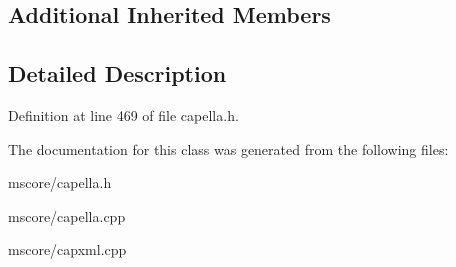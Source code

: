\subsection*{Additional Inherited Members}


\subsection{Detailed Description}


Definition at line 469 of file capella.\+h.



The documentation for this class was generated from the following files\+:\begin{DoxyCompactItemize}
\item 
mscore/capella.\+h\item 
mscore/capella.\+cpp\item 
mscore/capxml.\+cpp\end{DoxyCompactItemize}
